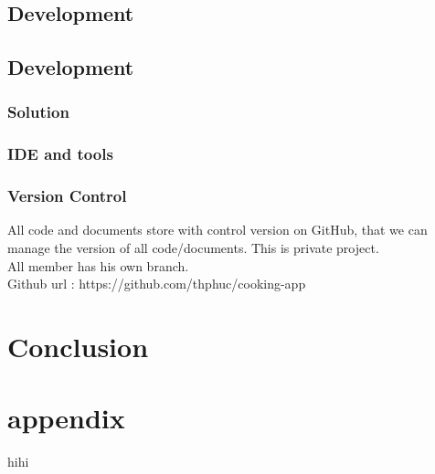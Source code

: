 \documentclass{article}
\begin{document}
\subsection{ Development}

\subsection{ Development}


\subsubsection{ Solution }

\subsubsection{ IDE and tools }
\subsubsection{ Version Control }
All code and documents store with control version on GitHub, that we can manage the version of all code/documents. This is private project. \\
All member has his own branch. \\
Github url : https://github.com/thphuc/cooking-app 

\section{Conclusion }



\section{appendix }

hihi
\citep{adams1995hitchhiker}



\end{document}
